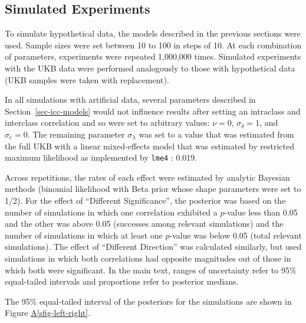 \documentclass[
  authoryear,
  preprint,
  1p]{elsarticle}
\newcommand*\quartosfigref[1]{Figure \hyperref[#1]{A\ref{#1}}}
\begin{document}
\FloatBarrier

\subsection{Simulated Experiments}\label{sec-sim-details}

To simulate hypothetical data, the models described in the previous
sections were used. Sample sizes were set between 10 to 100 in steps of
10. At each combination of parameters, experiments were repeated
1,000,000 times. Simulated experiments with the UKB data were performed
analogously to those with hypothetical data (UKB samples were taken with
replacement).

In all simulations with artificial data, several parameters described in
Section~\ref{sec-icc-models} would not influence results after setting
an intraclass and interclass correlation and so were set to arbitrary
values: \(\nu=0\), \(\sigma_\delta=1\), and \(\sigma_c=0\). The
remaining parameter \(\sigma_\lambda\) was set to a value that was
estimated from the full UKB with a linear mixed-effects model that was
estimated by restricted maximum likelihood as implemented by
\texttt{lme4} \citep{bates_fitting_2015}: 0.019.

Across repetitions, the rates of each effect were estimated by analytic
Bayesian methods (binomial likelihood with Beta prior whose shape
parameters were set to 1/2). For the effect of ``Different
Significance'', the posterior was based on the number of simulations in
which one correlation exhibited a \(p\)-value less than 0.05 and the
other was above 0.05 (successes among relevant simulations) and the
number of simulations in which at least one \(p\)-value was below 0.05
(total relevant simulations). The effect of ``Different Direction'' was
calculated similarly, but used simulations in which both correlations
had opposite magnitudes out of those in which both were significant. In
the main text, ranges of uncertainty refer to 95\% equal-tailed
intervals and proportions refer to posterior medians.

The 95\% equal-tailed interval of the posteriors for the simulations are
shown in \quartosfigref{sfig-left-right}.
\end{document}
